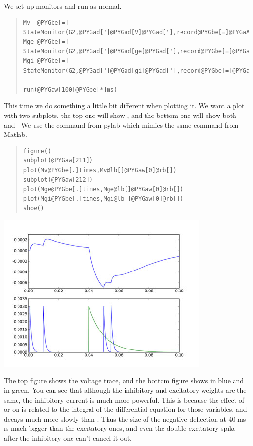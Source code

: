 \documentclass[letterpaper,10pt]{manual}
\begin{document}
We set up monitors and run as normal.
\begin{quote}

\begin{Verbatim}[commandchars=@\[\]]
Mv  @PYGbe[=] StateMonitor(G2,@PYGad[']@PYGad[V]@PYGad['],record@PYGbe[=]@PYGaA[True])
Mge @PYGbe[=] StateMonitor(G2,@PYGad[']@PYGad[ge]@PYGad['],record@PYGbe[=]@PYGaA[True])
Mgi @PYGbe[=] StateMonitor(G2,@PYGad[']@PYGad[gi]@PYGad['],record@PYGbe[=]@PYGaA[True])

run(@PYGaw[100]@PYGbe[*]ms)
\end{Verbatim}
\end{quote}

This time we do something a little bit different when plotting it. We want
a plot with two subplots, the top one will show , and the bottom one will
show both  and . We use the  command from pylab which mimics the
same command from Matlab.
\begin{quote}

\begin{Verbatim}[commandchars=@\[\]]
figure()
subplot(@PYGaw[211])
plot(Mv@PYGbe[.]times,Mv@lb[]@PYGaw[0]@rb[])
subplot(@PYGaw[212])
plot(Mge@PYGbe[.]times,Mge@lb[]@PYGaw[0]@rb[])
plot(Mgi@PYGbe[.]times,Mgi@lb[]@PYGaw[0]@rb[])
show()
\end{Verbatim}
\end{quote}

\includegraphics{2b.jpg}

The top figure shows the voltage trace, and the bottom figure shows  in
blue and  in green. You can see that although the inhibitory and
excitatory weights are the same, the inhibitory current is much more
powerful. This is because the effect of  or  on  is related to the
integral of the differential equation for those variables, and  decays
much more slowly than . Thus the size of the negative deflection at
40 ms is much bigger than the excitatory ones, and even the double
excitatory spike after the inhibitory one can't cancel it out.
\end{document}
